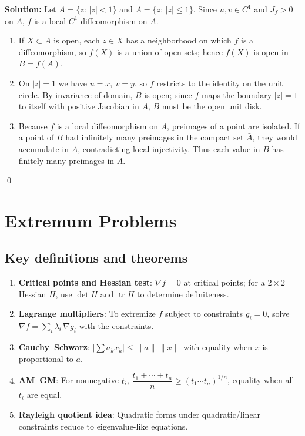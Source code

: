 \bigskip\noindent\textbf{Solution:}
Let $A=\{z:\,|z|<1\}$ and $\bar A=\{z:\,|z|\le 1\}$. Since $u,v\in C^1$ and $J_f>0$ on $A$, $f$ is a local $C^1$-diffeomorphism on $A$.
\begin{enumerate}[label=(\alph*)]
    \item If $X\subset A$ is open, each $z\in X$ has a neighborhood on which $f$ is a diffeomorphism, so $f(X)$ is a union of open sets; hence $f(X)$ is open in $B=f(A)$.
    \item On $|z|=1$ we have $u=x,\ v=y$, so $f$ restricts to the identity on the unit circle. By invariance of domain, $B$ is open; since $f$ maps the boundary $|z|=1$ to itself with positive Jacobian in $A$, $B$ must be the open unit disk.
    \item Because $f$ is a local diffeomorphism on $A$, preimages of a point are isolated. If a point of $B$ had infinitely many preimages in the compact set $\bar A$, they would accumulate in $A$, contradicting local injectivity. Thus each value in $B$ has finitely many preimages in $A$.
\end{enumerate}\qed
\section{Extremum Problems}
\subsection*{Key definitions and theorems}
\begin{enumerate}[label=(\roman*)]
    \item \textbf{Critical points and Hessian test}: $\nabla f=0$ at critical points; for a $2\times2$ Hessian $H$, use $\det H$ and $\operatorname{tr} H$ to determine definiteness.
    \item \textbf{Lagrange multipliers}: To extremize $f$ subject to constraints $g_i=0$, solve $\nabla f=\sum_i \lambda_i\,\nabla g_i$ with the constraints.
    \item \textbf{Cauchy--Schwarz}: $\big|\sum a_k x_k\big|\le \|a\|\,\|x\|$ with equality when $x$ is proportional to $a$.
    \item \textbf{AM--GM}: For nonnegative $t_i$, $\dfrac{t_1+\cdots+t_n}{n}\ge (t_1\cdots t_n)^{1/n}$, equality when all $t_i$ are equal.
    \item \textbf{Rayleigh quotient idea}: Quadratic forms under quadratic/linear constraints reduce to eigenvalue-like equations.
\end{enumerate}


